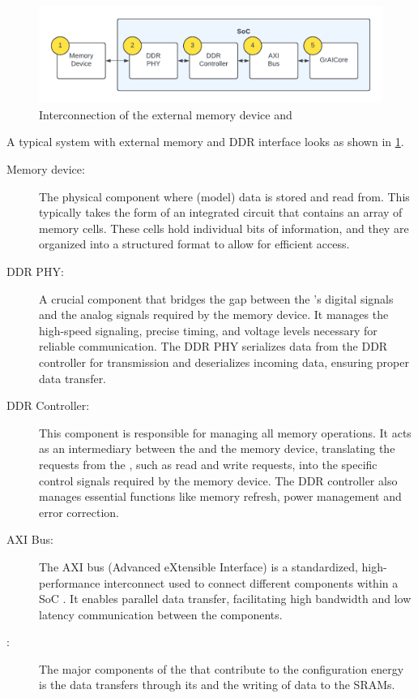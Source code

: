 \begin{figure}[hbtp]
    \centering
    \includegraphics[width=\linewidth]{assets/ddr_graicore_block_diagram.pdf}
    \caption{
        Interconnection of the external memory device and \graicore{}
    }
    \label{fig:ddr_graicore_block_diagram}
\end{figure}

A typical system with external memory and DDR interface looks as shown in \cref{fig:ddr_graicore_block_diagram}.
\begin{description}
    \item[Memory device:] 
    The physical component where (model) data is stored and read from.
    This typically takes the form of an integrated circuit that contains an array of memory cells.
    These cells hold individual bits of information, and they are organized into a structured format to allow for efficient access.
    \item[DDR PHY:] 
    A crucial component that bridges the gap between the \graicore{}'s digital signals and the analog signals required by the memory device.
    It manages the high-speed signaling, precise timing, and voltage levels necessary for reliable communication.
    The DDR PHY serializes data from the DDR controller for transmission and deserializes incoming data, ensuring proper data transfer.
    \item[DDR Controller:] 
    This component is responsible for managing all memory operations.
    It acts as an intermediary between the \graicore{} and the memory device, translating the requests from the \graicore{}, such as read and write requests, into the specific control signals required by the memory device.
    The DDR controller also manages essential functions like memory refresh, power management and error correction.
    \item[AXI Bus:] 
    The AXI bus (Advanced eXtensible Interface) is a standardized, high-performance interconnect used to connect different components within a SoC \cite{ARM_AXI_Specification}.
    It enables parallel data transfer, facilitating high bandwidth and low latency communication between the components.
    \item[\graicore{}:] 
    The major components of the \graicore{} that contribute to the configuration energy is the data transfers through its \confignoc{} and the writing of data to the SRAMs.
\end{description}

